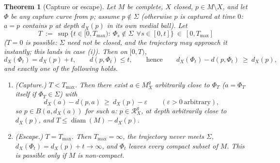 \documentclass[11pt]{article}
\newtheorem{theorem}{Theorem}[section]
\theoremstyle{remark}
\newcommand{\X}{X}
\newcommand{\Mg}{M^{g}_{\X}}
\newcommand{\Rg}{\mathcal{R}^{g}_{\X}}
\newcommand{\dX}{d_{\X}}
\begin{document}
\begin{theorem}[Capture or escape]\label{thm:capture}
Let $M$ be complete, $\X$ closed, $p\in M\setminus\X$, and let $\Phi$
be any capture curve from $p$; assume $p\notin\Sigma$ (otherwise $p$
is captured at time $0$: $a=p$ contains $p$ at depth $\dX(p)$ in its
own medial ball). Let
\[
  T\ :=\ \sup\bigl\{t\in[0,T_{\max}):\ \Phi_{s}\notin\Sigma\ \ \forall
  s\in[0,t]\bigr\}\ \in\ [0,T_{\max}]
\]
($T=0$ is possible: $\Sigma$ need not be closed, and the trajectory
may approach it instantly; this lands in case \textup{(i)}). Then on
$[0,T)$,
\begin{equation}\label{eq:rateone}
  \dX(\Phi_{t})=\dX(p)+t,
  \qquad
  d(p,\Phi_{t})\le t,
  \qquad\text{hence}\qquad
  \dX(\Phi_{t})-d(p,\Phi_{t})\ \ge\ \dX(p),
\end{equation}
and exactly one of the following holds.
\begin{enumerate}[label=\textup{(\roman*)}]
\item\emph{(Capture.)} $T<T_{\max}$. Then there exist $a\in\Mg$
arbitrarily close to $\Phi_{T}$ \textup{(}$a=\Phi_{T}$ itself if
$\Phi_{T}\in\Sigma$\textup{)} with
\[
  \dX(a)-d(p,a)\ \ge\ \dX(p)-\varepsilon
  \qquad(\varepsilon>0\ \text{arbitrary}),
\]
so $p\in B(a,\dX(a))$ for such $a$: \quad $p\in\Rg$, at depth
arbitrarily close to $\dX(p)$, and $T\le\operatorname{diam}(M)-\dX(p)$.
\item\emph{(Escape.)} $T=T_{\max}$. Then $T_{\max}=\infty$, the
trajectory never meets $\Sigma$, $\dX(\Phi_{t})=\dX(p)+t\to\infty$, and
$\Phi_{t}$ leaves every compact subset of $M$. This is possible only
if $M$ is non-compact.
\end{enumerate}
\end{theorem}
\end{document}
